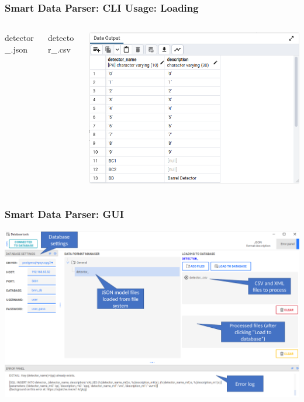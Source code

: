 \documentclass[8pt,pdf,hyperref={unicode}]{beamer}
\begin{document}
\begin{frame}
	\frametitle{Smart Data Parser: CLI Usage: Loading}
		\vspace{-3em}
		
		\begin{columns}
			\begin{column}{0.35\linewidth}
				\begin{block}{detector\_.json}
					
				\end{block}

			\end{column}
			\begin{column}{0.15\linewidth}
				\begin{block}{detector\_.csv}
					
				\end{block}
				
			\end{column}
			\begin{column}{0.4\linewidth}
				\includegraphics[width=\linewidth]{image/pgadmin.png}
			\end{column}
		\end{columns} 
\end{frame}

\begin{frame}
	\frametitle{Smart Data Parser: GUI}
	\includegraphics[width=\linewidth]{image/gui.pdf}
\end{frame}
\end{document}

